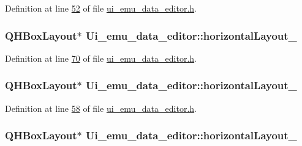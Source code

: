 Definition at line \hyperlink{a00051_source_l00052}{52} of file \hyperlink{a00051_source}{ui\+\_\+emu\+\_\+data\+\_\+editor.\+h}.

\hypertarget{a00026_aaee23fa38e3335cc652ebd35fcdbafc8}{
\subsubsection[{horizontal\+Layout\+\_\+2}]{\setlength{\rightskip}{0pt plus 5cm}Q\+H\+Box\+Layout$\ast$ Ui\+\_\+emu\+\_\+data\+\_\+editor\+::horizontal\+Layout\+\_}}\label{a00026_aaee23fa38e3335cc652ebd35fcdbafc8}


Definition at line \hyperlink{a00051_source_l00070}{70} of file \hyperlink{a00051_source}{ui\+\_\+emu\+\_\+data\+\_\+editor.\+h}.

\hypertarget{a00026_a42671894c25bd8dfcc6c0a1f8689ecb8}{
\subsubsection[{horizontal\+Layout\+\_\+4}]{\setlength{\rightskip}{0pt plus 5cm}Q\+H\+Box\+Layout$\ast$ Ui\+\_\+emu\+\_\+data\+\_\+editor\+::horizontal\+Layout\+\_}}\label{a00026_a42671894c25bd8dfcc6c0a1f8689ecb8}


Definition at line \hyperlink{a00051_source_l00058}{58} of file \hyperlink{a00051_source}{ui\+\_\+emu\+\_\+data\+\_\+editor.\+h}.

\hypertarget{a00026_ade915b192b206af66ce1fb317087ffb6}{
\subsubsection[{horizontal\+Layout\+\_\+5}]{\setlength{\rightskip}{0pt plus 5cm}Q\+H\+Box\+Layout$\ast$ Ui\+\_\+emu\+\_\+data\+\_\+editor\+::horizontal\+Layout\+\_}}\label{a00026_ade915b192b206af66ce1fb317087ffb6}


